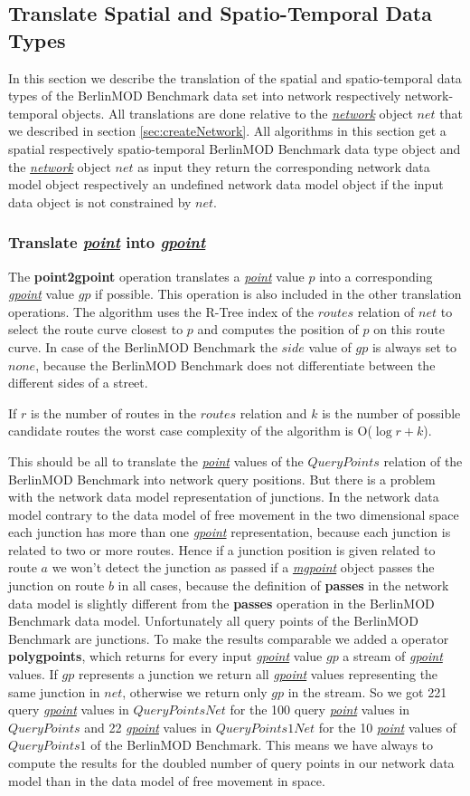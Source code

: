 \documentclass[a4paper]{article}
\newcommand{\bmodb} {BerlinMOD Benchmark}
\newcommand{\op}[1]{\textbf{#1}}
\newcommand{\dt}[1]{\textsl{\underline{#1}}}
\begin{document}
{\subsection{Translate Spatial and Spatio-Temporal Data Types}
\label{sec:translateSTdata}
In this section we describe the translation of the spatial and spatio-temporal
data types of the \bmodb{} data set into network respectively network-temporal
objects. All translations are done relative to the \dt{network} object $net$ that
we described in section \ref{sec:createNetwork}.
All algorithms in this section get a spatial respectively spatio-temporal \bmodb{}
data type object and the \dt{network} object $net$ as input they return the
corresponding network data model object respectively an undefined network data model
object if the input data object is not constrained by $net$.
\subsubsection{Translate \dt{point} into \dt{gpoint}}
The \op{point2gpoint} operation translates a \dt{point} value $p$ into a corresponding
\dt{gpoint} value $gp$ if possible. This operation is also included in the other translation
operations. The algorithm uses the R-Tree index of the
$routes$ relation of $net$ to select the route curve closest to $p$ and computes the
position of $p$ on this route curve. In case of the \bmodb{} the $side$ value of
$gp$ is always set to $none$, because the \bmodb{} does not differentiate between
the different sides of a street.

If $r$ is the number of routes in the $routes$ relation
and $k$ is the number of possible candidate routes the worst case complexity
of the algorithm is O($\log{r} + k$).

This should be all to translate the \dt{point} values of the $QueryPoints$
relation of the \bmodb{} into network query positions. But there is a problem with
the network data model representation of junctions. In the network data model
contrary to the data model of free movement in the two dimensional space each junction
has more than one \dt{gpoint} representation, because each junction is related to
two or more routes. Hence if a junction position is given related to route $a$
we won't detect the junction as passed if a \dt{mgpoint} object passes the junction
on route $b$ in all cases, because the definition of \op{passes} in the network
data model is slightly different from the \op{passes} operation in the \bmodb{} data model.
Unfortunately all query points of the \bmodb{} are junctions. To make the results
comparable we added a operator \op{polygpoints}, which returns for every input
\dt{gpoint} value $gp$ a stream of \dt{gpoint} values. If $gp$ represents a junction
we return all \dt{gpoint} values representing the same junction in $net$,
otherwise we return only $gp$ in the stream. So we got 221 query \dt{gpoint}
values in $QueryPointsNet$ for the 100 query \dt{point} values in
$QueryPoints$ and 22 \dt{gpoint} values in $QueryPoints1Net$ for the
10 \dt{point} values of $QueryPoints1$ of the \bmodb{}. This means we have
always to compute the results for the doubled number of query points in our network
data model than in the data model of free movement in space.
}
\end{document}
